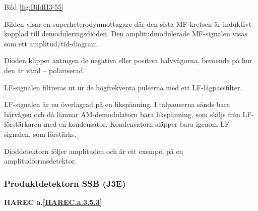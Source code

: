 Bild \ref{fig:BildII3-55}

Bilden visar en superheterodynmottagare där den sista MF-kretsen är
induktivt kopplad till demoduleringsdioden. Den amplitudmodulerade
MF-signalen visas som ett amplitud/tid-diagram.

Dioden klipper antingen de negativa eller positiva halvvågorna,
beroende på hur den är vänd -- polariserad.

LF-signalen filtreras ut ur de högfrekventa pulserna med ett
LF-lågpassfilter.

LF-signalen är nu överlagrad på en likspänning. I talpauserna sänds
bara bärvågen och då lämnar AM-demodulatorn bara likspänning, som
skiljs från LF-förstärkaren med en kondensator. Kondensatorn släpper
bara igenom LF-signalen, som förstärks.

Dioddetektorn följer amplituden och är ett exempel på en
amplitudformsdetektor.

\subsubsection{Produktdetektorn SSB (J3E)}
\textbf{HAREC a.\ref{HAREC.a.3.5.3}\label{myHAREC.a.3.5.3}}

